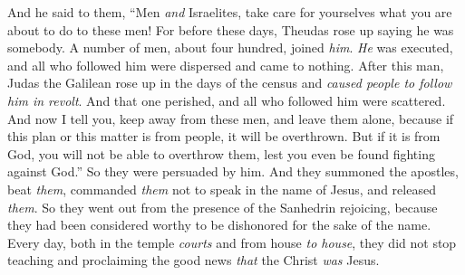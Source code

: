 \begin{biblechapter}
\verse And he said to them, “Men \textit{and} Israelites, take care for yourselves what you are about to do to these men!
\verse For before these days, Theudas rose up saying he was somebody. A number of men, about four hundred, joined \textit{him}. \textit{He} was executed, and all who followed him were dispersed and came to nothing.
\verse After this man, Judas the Galilean rose up in the days of the census and \textit{caused people to follow him in revolt}. And that one perished, and all who followed him were scattered.
\verse And now I tell you, keep away from these men, and leave them alone, because if this plan or this matter is from people, it will be overthrown.
\verse But if it is from God, you will not be able to overthrow them, lest you even be found fighting against God.” So they were persuaded by him.
\verse And they summoned the apostles, beat \textit{them}, commanded \textit{them} not to speak in the name of Jesus, and released \textit{them}.
\verse So they went out from the presence of the Sanhedrin rejoicing, because they had been considered worthy to be dishonored for the sake of the name.
\verse Every day, both in the temple \textit{courts} and from house \textit{to house}, they did not stop teaching and proclaiming the good news \textit{that} the Christ \textit{was} Jesus.
\end{biblechapter}


